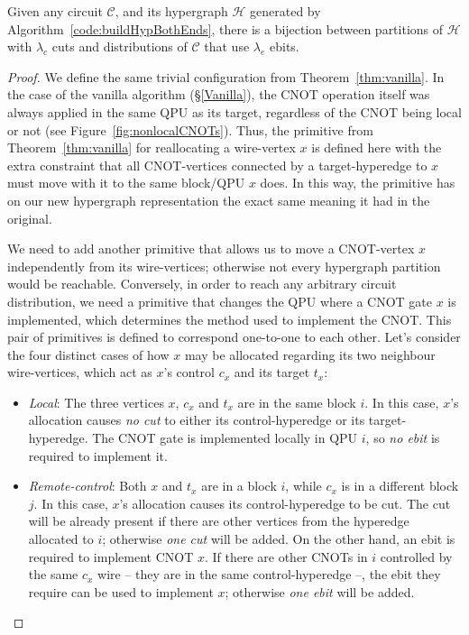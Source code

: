 \begin{theorem}
 Given any circuit \(\mathcal{C}\), and its hypergraph \(\mathcal{H}\) generated by Algorithm~\ref{code:buildHypBothEnds}, there is a bijection between partitions of \(\mathcal{H}\) with \(\lambda_c\) cuts and distributions of \(\mathcal{C}\) that use \(\lambda_e\) ebits.
 \label{thm:bothEnds}
\end{theorem}
\begin{proof}
We define the same trivial configuration from Theorem~\ref{thm:vanilla}. In the case of the vanilla algorithm (\S\ref{Vanilla}), the CNOT operation itself was always applied in the same QPU as its target, regardless of the CNOT being local or not (see Figure~\ref{fig:nonlocalCNOTs}). Thus, the primitive from Theorem~\ref{thm:vanilla} for reallocating a wire-vertex \(x\) is defined here with the extra constraint that all CNOT-vertices connected by a target-hyperedge to \(x\) must move with it to the same block/QPU \(x\) does. In this way, the primitive has on our new hypergraph representation the exact same meaning it had in the original. 

We need to add another primitive that allows us to move a CNOT-vertex \(x\) independently from its wire-vertices; otherwise not every hypergraph partition would be reachable. Conversely, in order to reach any arbitrary circuit distribution, we need a primitive that changes the QPU where a CNOT gate \(x\) is implemented, which determines the method used to implement the CNOT. This pair of primitives is defined to correspond one-to-one to each other. Let's consider the four distinct cases of how \(x\) may be allocated regarding its two neighbour wire-vertices, which  act as \(x\)'s control \(c_x\) and its target \(t_x\):
\begin{itemize}
  \item \textit{Local}: The three vertices \(x\), \(c_x\) and \(t_x\) are in the same block \(i\). In this case, \(x\)'s allocation causes \textit{no cut} to either its control-hyperedge or its target-hyperedge. The CNOT gate is implemented locally in QPU \(i\), so \textit{no ebit} is required to implement it.

  \item \textit{Remote-control}: Both \(x\) and \(t_x\) are in a block \(i\), while \(c_x\) is in a different block \(j\). In this case, \(x\)'s allocation causes its control-hyperedge to be cut. The cut will be already present if there are other vertices from the hyperedge allocated to \(i\); otherwise \textit{one cut} will be added. On the other hand, an ebit is required to implement CNOT \(x\). If there are other CNOTs in \(i\) controlled by the same \(c_x\) wire -- they are in the same control-hyperedge --, the ebit they require can be used to implement \(x\); otherwise \textit{one ebit} will be added.


\end{itemize}
\end{proof}
